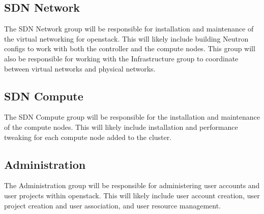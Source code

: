 \documentclass[12pt]{article}
\begin{document}
\subsection{SDN Network}
The SDN Network group will be responsible for installation and maintenance of the virtual networking for openstack. This will likely include
building Neutron configs to work with both the controller and the compute nodes. This group will also be responsible for working with the
Infrastructure group to coordinate between virtual networks and physical networks.

\subsection{SDN Compute}
The SDN Compute group will be responsible for the installation and maintenance of the compute nodes. This will likely include installation
and performance tweaking for each compute node added to the cluster. 

\subsection{Administration}
The Administration group will be responsible for administering user accounts and user projects within openstack. This will likely include
user account creation, user project creation and user association, and user resource management.
\end{document}
